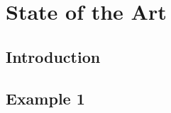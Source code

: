 \chapter{State of the Art}\label{chap:state-of-the-art}

\section{Introduction}


\section{Example 1}

